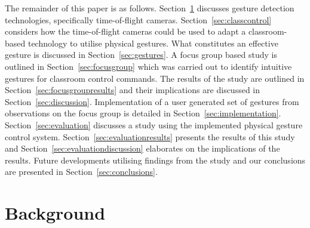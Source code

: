 \documentclass[manuscript, review, screen]{acmart}
\begin{document}
The remainder of this paper is as follows. 
Section~\ref{sec:related} discusses gesture detection technologies, specifically time-of-flight cameras.
Section~\ref{sec:classcontrol} considers how the time-of-flight cameras could be used to adapt a classroom-based technology to utilise physical gestures.
What constitutes an effective gesture is discussed in Section~\ref{sec:gestures}.
A focus group based study is outlined in Section~\ref{sec:focusgroup} which was carried out to identify intuitive gestures for classroom control commands.
The results of the study are outlined in Section~\ref{sec:focusgroupresults} and their implications are discussed in Section~\ref{sec:discussion}. 
Implementation of a user generated set of gestures from observations on the focus group is detailed in Section~\ref{sec:implementation}.
Section~\ref{sec:evaluation} discusses a study using the implemented physical gesture control system.
Section~\ref{sec:evaluationresults} presents the results of this study and Section~\ref{sec:evaluationdiscussion} elaborates on the implications of the results.
Future developments utilising findings from the study and our conclusions are presented in Section~\ref{sec:conclusions}.



\section{Background} 
\label{sec:related}
\end{document}
